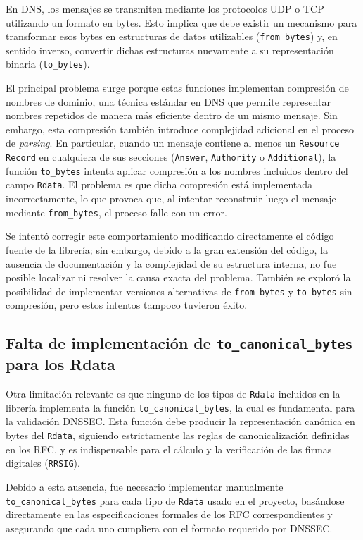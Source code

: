 En DNS, los mensajes se transmiten mediante los protocolos UDP o TCP utilizando un formato en bytes. Esto implica que debe existir un mecanismo para transformar esos bytes en estructuras de datos 
utilizables (\texttt{from\_bytes}) y, en sentido inverso, convertir dichas estructuras nuevamente a su representación binaria (\texttt{to\_bytes}).

El principal problema surge porque estas funciones implementan compresión de nombres de dominio, una técnica estándar en DNS que permite representar nombres repetidos de manera más eficiente dentro 
de un mismo mensaje. Sin embargo, esta compresión también introduce complejidad adicional en el proceso de \textit{parsing}. En particular, cuando un mensaje contiene al menos un \texttt{Resource Record} 
en cualquiera de sus secciones (\texttt{Answer}, \texttt{Authority} o \texttt{Additional}), la función \texttt{to\_bytes} intenta aplicar compresión a los nombres incluidos dentro del 
campo \texttt{Rdata}. El problema es que dicha compresión está implementada incorrectamente, lo que provoca que, al intentar reconstruir luego el mensaje mediante \texttt{from\_bytes}, 
el proceso falle con un error.

Se intentó corregir este comportamiento modificando directamente el código fuente de la librería; sin embargo, debido a la gran extensión del código, la ausencia de documentación y la complejidad 
de su estructura interna, no fue posible localizar ni resolver la causa exacta del problema. También se exploró la posibilidad de implementar versiones alternativas de \texttt{from\_bytes} y 
\texttt{to\_bytes} sin compresión, pero estos intentos tampoco tuvieron éxito.

\subsection{Falta de implementación de \texttt{to\_canonical\_bytes} para los Rdata}

Otra limitación relevante es que ninguno de los tipos de \texttt{Rdata} incluidos en la librería implementa la función \texttt{to\_canonical\_bytes}, la cual es fundamental para la validación DNSSEC. 
Esta función debe producir la representación canónica en bytes del \texttt{Rdata}, siguiendo estrictamente las reglas de canonicalización definidas en los RFC, y es indispensable para el cálculo y 
la verificación de las firmas digitales (\texttt{RRSIG}).

Debido a esta ausencia, fue necesario implementar manualmente \texttt{to\_canonical\_bytes} para cada tipo de \texttt{Rdata} usado en el proyecto, basándose directamente en las especificaciones 
formales de los RFC correspondientes y asegurando que cada uno cumpliera con el formato requerido por DNSSEC.

